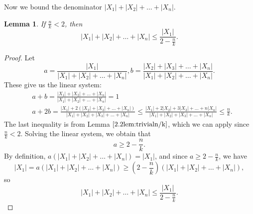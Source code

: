 \documentclass{amsart}
\newcommand{\1}{\mathds{1}}
\newtheorem{lemma}[theorem]{Lemma}
\numberwithin{theorem}{section}
\newcommand{\Xsum}{|X_1|+|X_2|+\ldots+|X_n|}
\newcommand{\wXsum}{|X_1|+2|X_2|+\ldots +n|X_n|}
\newcommand{\tXsum}{|X_2|+|X_3|+\ldots+|X_n|}
\begin{document}
Now we bound the denominator $\Xsum$.
\begin{lemma}\label{3.6:lem-den} %
If $\frac n k < 2$, then
        $$\Xsum \leq \frac{|X_1|}{2-\frac{n}{k}}.$$
    \end{lemma}
    \begin{proof}
        Let $$a=\frac{|X_1|}{\Xsum},b=\frac{\tXsum}{\Xsum}.$$
       These give us the linear system: 
       \begin{align*}
           &a+b=\frac{\Xsum}{\Xsum}=1 \\
           &a+2b=\frac{|X_1|+2(|X_2|+|X_3|+\ldots+ |X_n|)}{|X_1|+|X_2|+|X_3|+\ldots+ |X_n|}\leq \frac{|X_1|+2|X_2|+3|X_3|+\ldots+ n|X_n|}{|X_1|+|X_2|+|X_3|+\ldots+ |X_n|}\leq \frac{n}{k}.
       \end{align*}
        The last inequality is from Lemma $\ref{2.2lem:trivialn/k}$, which we can apply since $\frac n k< 2$.
        Solving the linear system, we obtain that 
        $$a\geq 2-\frac{n}{k}.$$
        By definition, $a(\Xsum)=|X_1|$, and since $a\geq 2-\frac{n}{k}$, we have $$|X_1|=a(\Xsum)\geq (2-\frac{n}{k})(\Xsum), $$ so $$\Xsum \leq \frac{|X_1|}{2-\frac{n}{k}}.$$
    \end{proof}
\end{document}

